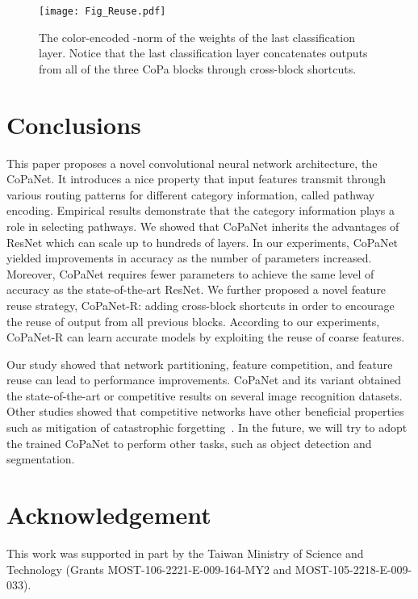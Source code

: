 \documentclass[wcp]{jmlr}
\begin{document}
\begin{figure}
\centering
\texttt{[image: Fig\_Reuse.pdf]}
\caption{The color-encoded -norm of the weights of the last classification layer. Notice that the last classification layer  concatenates outputs from all of the three CoPa blocks through cross-block shortcuts.}
\label{reuse}
\end{figure}


\section{Conclusions}
This paper proposes a novel convolutional neural network architecture, the CoPaNet. 
It introduces a nice property that input features transmit through various routing patterns for different category information, called pathway encoding.
Empirical results demonstrate that the category information plays a role in selecting pathways.
We showed that CoPaNet inherits the advantages of ResNet which can scale up to hundreds of layers.
In our experiments, CoPaNet yielded improvements in accuracy as the number of parameters increased. 
Moreover, CoPaNet requires fewer parameters to achieve the same level of accuracy as the state-of-the-art ResNet.
We  further proposed a novel feature reuse strategy, CoPaNet-R: adding cross-block shortcuts in order to encourage the reuse of output from all previous blocks. 
According to our experiments, CoPaNet-R can learn accurate models by exploiting the reuse of coarse features.

Our study showed that network partitioning, feature competition, and feature reuse can lead to performance improvements.
CoPaNet and its variant obtained the state-of-the-art or competitive results on several image recognition datasets.
Other studies showed that competitive networks have other beneficial properties such as mitigation of catastrophic forgetting~\citep{srivastava2013compete}.
In the future, we will try to adopt the trained CoPaNet to perform other tasks, such as object detection and segmentation.

\section*{Acknowledgement}
This work was supported in part by the Taiwan Ministry of Science and Technology (Grants MOST-106-2221-E-009-164-MY2 and MOST-105-2218-E-009-033). 


\end{document}
